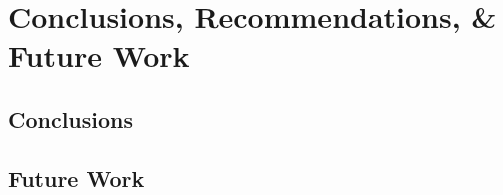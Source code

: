 \chapter{Conclusions, Recommendations, \& Future Work}\label{ch:Conclusions}
  \section{Conclusions}\label{sec:Conclusions}
    \lipsum[34-36]
  \section{Future Work}\label{sec:futureWork}
    \lipsum[38]\cite{TEST}

  \printreferences 